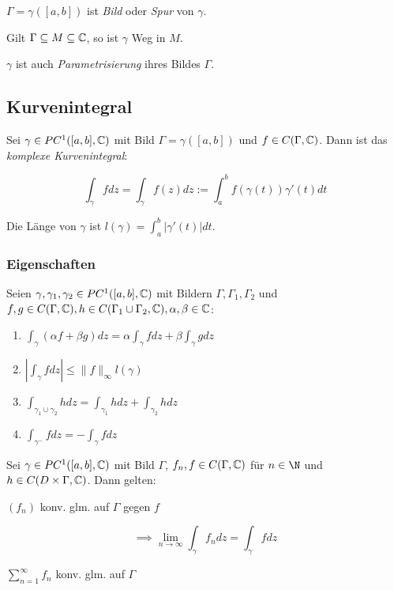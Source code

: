 $\Gamma = \gamma([a,b])$ ist \emph{Bild} oder \emph{Spur} von $\gamma$.

Gilt $\Gamma \subseteq M \subseteq \mathbb{C}$, so ist $\gamma$ Weg in $M$.

$\gamma$ ist auch \emph{Parametrisierung} ihres Bildes $\Gamma$.

\subsection*{Kurvenintegral}

Sei $\gamma \in PC^1([a,b],\mathbb{C})$ mit Bild $\Gamma = \gamma([a,b])$ und $f \in C(\Gamma,\mathbb{C})$. Dann ist das \emph{komplexe Kurvenintegral}:

\vspace*{-2mm}
$$\int_\gamma f dz = \int_\gamma f(z) dz := \int_a^b f(\gamma(t))\gamma'(t) dt$$

Die Länge von $\gamma$ ist $l(\gamma) = \int_a^b |\gamma'(t)| dt$.

\subsubsection*{Eigenschaften}

Seien $\gamma, \gamma_1, \gamma_2 \in PC^1([a,b],\mathbb{C})$ mit Bildern $\Gamma, \Gamma_1, \Gamma_2$ und $f, g \in C(\Gamma,\mathbb{C}), h \in C(\Gamma_1 \cup \Gamma_2, \mathbb{C}), \alpha, \beta \in \mathbb{C}$:

\begin{enumerate}[label=(\alph*)]
	\item $\int_\gamma (\alpha f + \beta g) dz = \alpha \int_\gamma f dz + \beta \int_\gamma g dz$
	\item $|\int_\gamma f dz| \leq \|f\|_\infty l(\gamma)$
	\item $\int_{\gamma_1 \cup \gamma_2} h dz = \int_{\gamma_1} h dz + \int_{\gamma_2} h dz$
	\item $\int_{\gamma^-} f dz = - \int_{\gamma} f dz$
\end{enumerate}

Sei $\gamma \in PC^1([a,b],\mathbb{C})$ mit Bild $\Gamma$, $f_n, f \in C(\Gamma,\mathbb{C})$ für $n \in \N$ und $h \in C(D\times\Gamma,\mathbb{C})$. Dann gelten:

\spacing

$(f_n)$ konv. glm. auf $\Gamma$ gegen $f$

\vspace*{-2mm}
$$\implies \displaystyle\lim_{n\to\infty} \int_\gamma f_n dz = \int_\gamma f dz$$

$\sum_{n=1}^\infty f_n$ konv. glm. auf $\Gamma$

